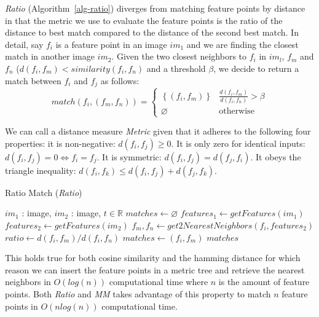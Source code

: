 \emph{Ratio} (Algorithm~\ref{alg-ratio}) \cite{lowe2004sift} diverges 
from matching feature points by distance in that the metric we use to 
evaluate the feature points is the ratio of the distance to best match 
compared to the distance of the second best match. In detail, say $f_i$ 
is a feature point in an image $im_1$ and we are finding the closest 
match in another image $im_2$. Given the two closest neighbors to $f_i$ 
in $im_l$, $f_m$ and $f_n$ ($d(f_i,f_m) < similarity(f_i,f_n)$ and a 
threshold $\beta$, we decide to return a match between $f_i$ and $f_j$ 
as follows:
\begin{equation*}
    match(f_i,(f_m,f_n)) = \begin{cases}
        \left\{(f_i,f_m)\right\} &
        \frac{d(f_i,f_m)}{d(f_i,f_n)} > \beta \\ \varnothing & 
        \mbox{otherwise}
    \end{cases}
\end{equation*}


We can call a distance measure \emph{Metric} given that it adheres to 
the following four properties: it is non-negative: $d(f_i,f_j) \geq 0$.  
It is only zero for identical inputs: $d(f_i,f_j) = 0 \Leftrightarrow 
f_i = f_j$. It is symmetric: $d(f_i,f_j) = d(f_j,f_i)$. It obeys the 
triangle inequality: $d(f_i,f_k) \leq d(f_i,f_j) + d(f_j,f_k)$.

\begin{algorithm}[t]
\caption{Ratio Match (\emph{Ratio})}
\label{alg-ratio}
\begin{algorithmic}
\Require $im_1$ : image, $im_2$ : image, $t \in \mathbb{R}$
\State $matches\gets \varnothing$
\State $features_1 \gets getFeatures(im_1)$
\State $features_2 \gets getFeatures(im_2)$
    \State $f_m,f_n \gets get2NearestNeighbors(f_i, features_2)$
    \State $ratio \gets d(f_i, f_m) / d(f_i, f_n)$
        \State $matches \gets \left(f_i, f_m\right)$
	\EndIf
\EndFor
\Return $matches$
\end{algorithmic}
\end{algorithm}

This holds true for both cosine similarity and the hamming distance for 
which reason we can insert the feature points in a metric tree and 
retrieve the nearest neighbors in $O(log(n))$ computational time where 
$n$ is the amount of feature points.  Both \emph{Ratio} and \emph{MM} 
takes advantage of this property to match $n$ feature points in 
$O(nlog(n))$ computational time.


